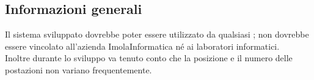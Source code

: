 \subsection*{Informazioni generali}
Il sistema sviluppato dovrebbe poter essere utilizzato da qualsiasi ; non dovrebbe essere vincolato all'azienda ImolaInformatica né ai laboratori informatici.\\
Inoltre durante lo sviluppo va tenuto conto che la posizione e il numero delle postazioni non variano frequentemente.

